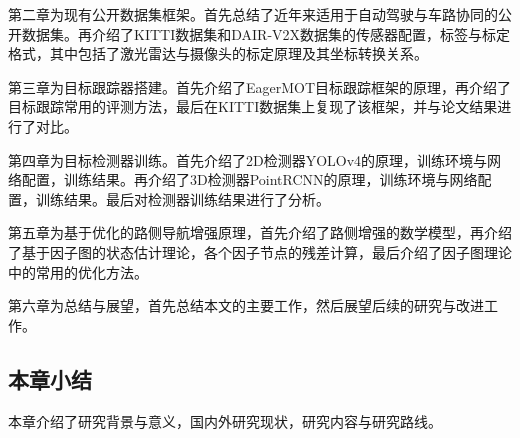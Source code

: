 第二章为现有公开数据集框架。首先总结了近年来适用于自动驾驶与车路协同的公开数据集。再介绍了KITTI数据集和DAIR-V2X数据集的传感器配置，标签与标定格式，其中包括了激光雷达与摄像头的标定原理及其坐标转换关系。

第三章为目标跟踪器搭建。首先介绍了EagerMOT目标跟踪框架的原理，再介绍了目标跟踪常用的评测方法，最后在KITTI数据集上复现了该框架，并与论文结果进行了对比。

第四章为目标检测器训练。首先介绍了2D检测器YOLOv4的原理，训练环境与网络配置，训练结果。再介绍了3D检测器PointRCNN的原理，训练环境与网络配置，训练结果。最后对检测器训练结果进行了分析。

第五章为基于优化的路侧导航增强原理，首先介绍了路侧增强的数学模型，再介绍了基于因子图的状态估计理论，各个因子节点的残差计算，最后介绍了因子图理论中的常用的优化方法。

第六章为总结与展望，首先总结本文的主要工作，然后展望后续的研究与改进工作。

\subsection{本章小结}

本章介绍了研究背景与意义，国内外研究现状，研究内容与研究路线。